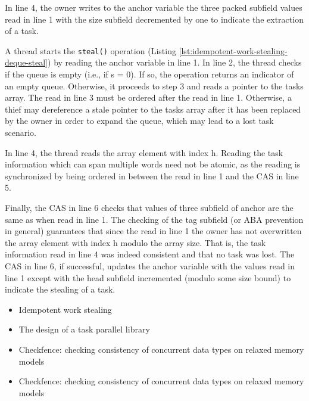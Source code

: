 In line 4, the owner writes to the anchor variable the three packed
subfield values read in line 1 with the size subfield decremented by
one to indicate the extraction of a task.




A thread starts the \lstinline!steal()! operation (Listing
\ref{lst:idempotent-work-stealing-deque-steal}) by reading the anchor
variable in line 1. In line 2, the thread checks if the queue is empty
(i.e., if s = 0). If so, the operation returns an indicator of an
empty queue. Otherwise, it proceeds to step 3 and reads a pointer to
the tasks array. The read in line 3 must be ordered after the read in
line 1. Otherwise, a thief may dereference a stale pointer to the
tasks array after it has been replaced by the owner in order to expand
the queue, which may lead to a lost task scenario.

In line 4, the thread reads the array element with index h. Reading
the task information which can span multiple words need not be atomic,
as the reading is synchronized by being ordered in between the read in
line 1 and the CAS in line 5.

Finally, the CAS in line 6 checks that values of three subfield of
anchor are the same as when read in line 1. The checking of the tag
subfield (or ABA prevention in general) guarantees that since the read
in line 1 the owner has not overwritten the array element with index h
modulo the array size. That is, the task information read in line 4
was indeed consistent and that no task was lost. The CAS in line 6, if
successful, updates the anchor variable with the values read in line 1
except with the head subfield incremented (modulo some size bound) to
indicate the stealing of a task.





\begin{itemize}
\item Idempotent work stealing \cite{Michael2009}
\item The design of a task parallel library \cite{Leijen2009}
\item Checkfence: checking consistency of concurrent data types on
  relaxed memory models \cite{Burckhardt2007}
\item Checkfence: checking consistency of concurrent data types on
  relaxed memory models \cite{Burckhardt2007a}
\end{itemize}

